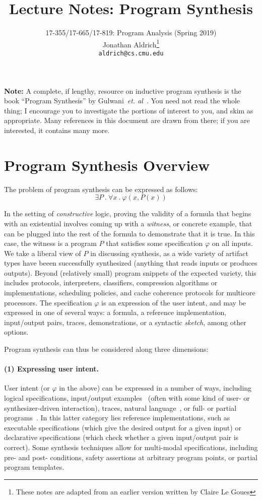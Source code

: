 \documentclass[11pt]{article}
\title{Lecture Notes: Program Synthesis}
\author{17-355/17-665/17-819: Program Analysis (Spring 2019)\\
        Jonathan Aldrich\footnote{These notes are adapted from an earlier version written by Claire Le Goues}\\
		{\tt aldrich@cs.cmu.edu}}
\date{}
\begin{document}
\maketitle

\noindent\textbf{Note:} A complete, if lengthy, resource on inductive program
synthesis is the book ``Program Synthesis'' by
Gulwani~\emph{et. al}~\cite{synthesisBook}.  You need not read the whole thing;
I encourage you to investigate the portions of interest to you, and skim as
appropriate. Many references in this document are drawn from there; if you are
interested, it contains many more.

\section{Program Synthesis Overview}

The problem of program synthesis can be expressed as follows:
\[
\exists P~.~ \forall x~.~ \varphi (x, P(x))
\]

In the setting of \textit{constructive} logic, proving the validity of a formula
that begins with an existential involves coming up with a \textit{witness}, or
concrete example, that can be plugged into the rest of the formula to demonstrate
that it is true.
In this case, the witness is a program $P$ that satisfies some specification
$\varphi$ on all inputs.  
We take a liberal view of $P$ in discussing synthesis, as a wide
variety of artifact types have beeen successfully synthesized (anything that reads
inputs or produces outputs).  Beyond (relatively small) program snippets of the
expected variety, this includes protocols, interpreters, classifiers,
compression algorithms or implementations, scheduling policies, and cache coherence
protocols for multicore processors.  The specification $\varphi$ is an
expression of the user intent, and may be expressed in one of several ways: a
formula, a reference implementation, input/output pairs, traces, demonstrations,
or a syntactic \emph{sketch}, among other options.

Program synthesis can thus be considered along three dimensions: 

\paragraph{(1) Expressing user intent.} User intent (or $\varphi$ in the above) can be expressed in a number of
ways, including logical specifications, input/output examples~\cite{Gulwani2016} (often with some
kind of user- or synthesizer-driven interaction), traces, natural language~\cite{Desai2016,Gulwani2014,Le2013}, or full- or partial programs~\cite{sketch}.
In this latter category lies reference implementations, such as executable
specifications (which give the desired output for a given input) or declarative
specifications (which check whether a given input/output pair is correct).
Some synthesis techniques allow for multi-modal specifications, including pre-
and post- conditions, safety assertions at arbitrary program points, or partial
program templates.
\end{document}
